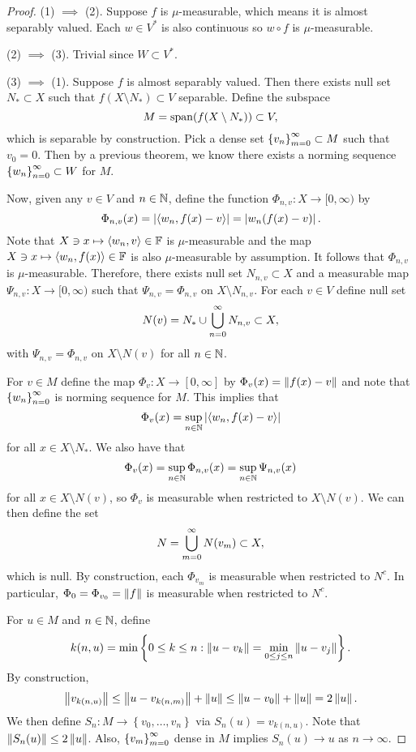 \documentclass[a4paper]{article}
\begin{document}
\begin{proof}
  (1) $\implies$ (2). Suppose $f$ is $\mu$-measurable, 
  which means it is almost separably valued.
  Each $w \in V^*$ is also continuous so 
  $w \circ f$ is $\mu$-measurable.

  (2) $\implies$ (3). Trivial since $W \subset V^*$.
  
  (3) $\implies$ (1). Suppose $f$ is almost separably valued.
  Then there exists null set $N_* \subset X$ such that 
  $f(X \setminus N_*) \subset V$ separable. Define the subspace 
  \[
  M = \operatorname{span}(f(X \setminus N_*)) \subset V,
  \] 
  which is separable by construction. Pick a dense 
  set $\left\{ v_n \right\}_{m=0}^\infty \subset M$ such that $v_0 = 0$. 
  Then by a previous theorem, we know there exists
  a norming sequence $\left\{ w_n \right\}_{n=0}^\infty \subset W$ for $M$.
  
  Now, given any $v \in V$ and $n \in \mathbb{N}$, define 
  the function $\Phi_{n, v} : X \to [0, \infty)$ 
  by 
  \[
  \Phi_{n, v}(x) = \left\lvert \left\langle w_n, f(x) - v \right\rangle\right\rvert
  = \left\lvert w_n(f(x) - v)\right\rvert.
  \]
  Note that $X \ni x \mapsto \left\langle w_n, v \right\rangle \in \mathbb{F}$ is 
  $\mu$-measurable and the map $X \ni x \mapsto 
  \left\langle w_n, f(x) \right\rangle \in \mathbb{F}$ is also $\mu$-measurable
  by assumption. It follows that 
  $\Phi_{n, v}$ is $\mu$-measurable. Therefore, 
  there exists null set $N_{n, v} \subset X$ and 
  a measurable map $\Psi_{n, v} : X \to [0, \infty)$
  such that $\Psi_{n, v} = \Phi_{n, v}$ on $X \setminus 
  N_{n, v}$. For each $v \in V$ define null set 
  \[
  N(v) = N_* \cup \bigcup_{n=0}^\infty N_{n, v} \subset X,
  \]
  with $\Psi_{n, v} = \Phi_{n, v}$ on $X \setminus N(v)$
  for all $n \in \mathbb{N}$. 

  For $v \in M$ define the map $\Phi_v : X \to [0, \infty]$
  by $\Phi_v(x) = \left\lVert f(x) - v\right\rVert$ and note that 
  $\left\{ w_n \right\}_{n=0}^\infty$ is norming sequence for $M$. 
  This implies that 
  \[
  \Phi_v(x) = \sup_{n \in \mathbb{N}} \left\lvert \left\langle w_n, f(x) - v \right\rangle\right\rvert
  \]
  for all $x \in X \setminus N_*$. We also have that 
  \[
  \Phi_v(x) = \sup_{n \in \mathbb{N}} \Phi_{n, v}(x) 
  = \sup_{n \in \mathbb{N}} \Psi_{n, v}(x)
  \]
  for all $x \in X \setminus N(v)$, so $\Phi_v$ 
  is measurable when restricted to $X \setminus N(v)$.
  We can then define the set 
  \[
  N = \bigcup_{m=0}^\infty N(v_m) \subset X, 
  \]
  which is null. By construction, each $\Phi_{v_m}$
  is measurable when restricted to $N^c$. 
  In particular, $\Phi_0 = \Phi_{v_0} = \left\lVert f\right\rVert$ 
  is measurable when restricted to $N^c$.

  For $u \in M$ and $n \in \mathbb{N}$, define 
  \[
  k(n, u) = \min \left\{ 0 \leq k \leq n :
  \left\lVert u - v_k\right\rVert = \min_{0 \leq j \leq n} 
  \left\lVert u - v_j\right\rVert \right\}.
  \]
  By construction, 
  \[
  \left\lVert v_{k(n, u)}\right\rVert 
  \leq \left\lVert u - v_{k(n, m)}\right\rVert + \left\lVert u\right\rVert
  \leq \left\lVert u - v_0\right\rVert + \left\lVert u\right\rVert 
  = 2\left\lVert u\right\rVert.
  \]
  We then define $S_n: M \to \left\{ v_0, \dots, v_n
  \right\}$ via $S_n(u) = v_{k(n, u)}$. Note that 
  $\left\lVert S_n(u)\right\rVert \leq 2 \left\lVert u\right\rVert$. Also, 
  $\left\{ v_m \right\}_{m=0}^\infty$ dense in $M$ implies
  $S_n(u) \to u$ as $n \to \infty$. 


\end{proof}
\end{document}
